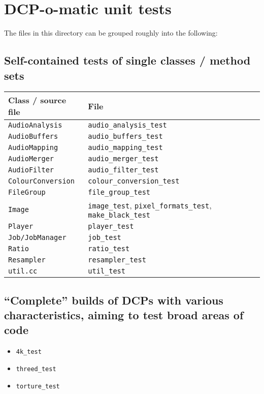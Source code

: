 \documentclass{article}
\newcommand{\co}[1]{\texttt{#1}}
\begin{document}
\section{DCP-o-matic unit tests}

The files in this directory can be grouped roughly into the following:

\subsection{Self-contained tests of single classes / method sets}

\begin{tabular}{|l|l|}
  \hline
  \textbf{Class / source file} & \textbf{File} \\
  \hline
  \co{AudioAnalysis} & \co{audio\_analysis\_test} \\
  \hline
  \co{AudioBuffers} & \co{audio\_buffers\_test} \\
  \hline
  \co{AudioMapping} & \co{audio\_mapping\_test} \\
  \hline
  \co{AudioMerger} & \co{audio\_merger\_test} \\
  \hline
  \co{AudioFilter} & \co{audio\_filter\_test} \\
  \hline
  \co{ColourConversion} & \co{colour\_conversion\_test} \\
  \hline
  \co{FileGroup} & \co{file\_group\_test} \\
  \hline
  \co{Image} & \co{image\_test}, \co{pixel\_formats\_test}, \co{make\_black\_test} \\
  \hline
  \co{Player} & \co{player\_test} \\
  \hline
  \co{Job/JobManager} & \co{job\_test} \\
  \hline
  \co{Ratio} & \co{ratio\_test} \\
  \hline
  \co{Resampler} & \co{resampler\_test} \\
  \hline
  \co{util.cc} & \co{util\_test} \\
  \hline
\end{tabular}

\subsection{``Complete'' builds of DCPs with various characteristics, aiming to test broad areas of code}

\begin{itemize}
  \item \co{4k\_test}
  \item \co{threed\_test}
  \item \co{torture\_test}
\end{itemize}
\end{document}
